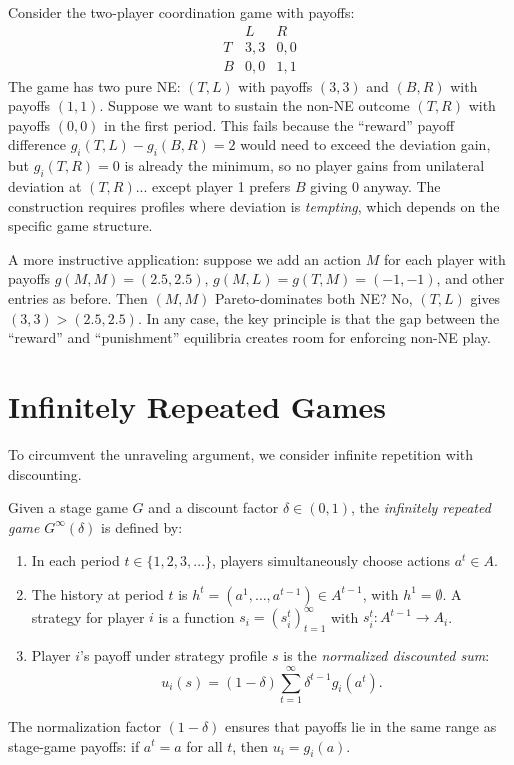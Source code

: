 \documentclass[11pt,a4paper]{article}
\begin{document}
\begin{example}
\label{ex:coordination-repeated}
Consider the two-player coordination game with payoffs:
\[
\begin{array}{c|cc}
  & L & R \\ \hline
T & 3,3 & 0,0 \\
B & 0,0 & 1,1
\end{array}
\]
The game has two pure NE: $(T,L)$ with payoffs $(3,3)$ and $(B,R)$ with
payoffs $(1,1)$. Suppose we want to sustain the non-NE outcome $(T,R)$ with
payoffs $(0,0)$ in the first period. This fails because the ``reward''
payoff difference $g_i(T,L) - g_i(B,R) = 2$ would need to exceed the
deviation gain, but $g_i(T,R) = 0$ is already the minimum, so no player
gains from unilateral deviation at $(T,R)$... except player 1 prefers $B$
giving $0$ anyway. The construction requires profiles where deviation
is \emph{tempting}, which depends on the specific game structure.

A more instructive application: suppose we add an action $M$ for each
player with payoffs $g(M,M) = (2.5, 2.5)$, $g(M,L) = g(T,M) = (-1,-1)$,
and other entries as before. Then $(M,M)$ Pareto-dominates both NE? No,
$(T,L)$ gives $(3,3) > (2.5, 2.5)$. In any case, the key principle is that
the gap between the ``reward'' and ``punishment'' equilibria creates room
for enforcing non-NE play.
\end{example}


\section{Infinitely Repeated Games}
\label{sec:infinitely-repeated}

To circumvent the unraveling argument, we consider infinite repetition
with discounting.

\begin{definition}
\label{def:infinitely-repeated}
Given a stage game $G$ and a discount factor $\delta \in (0,1)$, the
\emph{infinitely repeated game} $G^\infty(\delta)$ is defined by:
\begin{enumerate}[label=(\alph*)]
    \item In each period $t \in \{1, 2, 3, \ldots\}$, players simultaneously
    choose actions $a^t \in A$.
    \item The history at period $t$ is
    $h^t = (a^1, \ldots, a^{t-1}) \in A^{t-1}$, with $h^1 = \emptyset$.
    A strategy for player $i$ is a function
    $s_i = (s_i^t)_{t=1}^\infty$ with $s_i^t : A^{t-1} \to A_i$.
    \item Player $i$'s payoff under strategy profile $s$ is the
    \emph{normalized discounted sum}:
    \[
        u_i(s) = (1 - \delta) \sum_{t=1}^{\infty} \delta^{t-1}
        g_i(a^t).
    \]
\end{enumerate}
The normalization factor $(1-\delta)$ ensures that payoffs lie in the same
range as stage-game payoffs: if $a^t = a$ for all $t$, then $u_i = g_i(a)$.
\end{definition}
\end{document}
